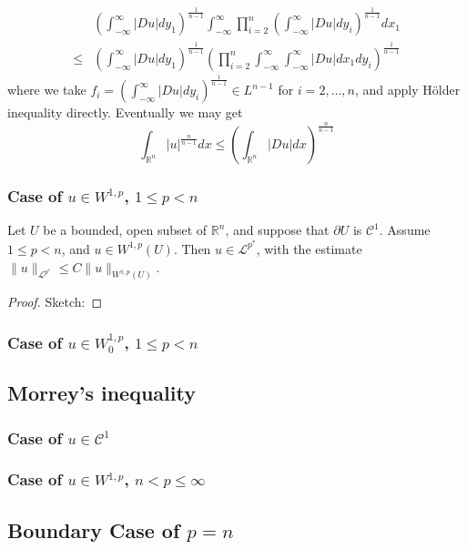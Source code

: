 \documentclass{article}
\begin{document}
\begin{align*}
    &\left(\int_{-\infty}^{\infty}|Du|dy_1\right)^{\frac{1}{n-1}}\int_{-\infty}^{\infty}\prod_{i=2}^{n}\left(\int_{-\infty}^{\infty}|Du|dy_i\right)^{\frac{1}{n-1}}dx_1 \\
    \leq& \left(\int_{-\infty}^{\infty}|Du|dy_1\right)^{\frac{1}{n-1}}\left(\prod_{i=2}^{n}\int_{-\infty}^{\infty}\int_{-\infty}^{\infty}|Du|dx_1dy_i\right)^{\frac{1}{n-1}}
\end{align*}
where we take $f_i=\left(\int_{-\infty}^{\infty}|Du|dy_i\right)^{\frac{1}{n-1}}\in L^{n-1}$ for $i=2, \dots, n$, and apply Hölder inequality directly. Eventually we may get
$$
\int_{\mathbb{R}^n}|u|^{\frac{n}{n-1}}dx\leq\left(\int_{\mathbb{R}^n}|Du|dx\right)^{\frac{n}{n-1}}
$$

\subsubsection{Case of $u\in W^{1,p}$, $1\leq p< n$}

\begin{Th}
    Let $U$ be a bounded, open subset of $\mathbb{R}^n$, and suppose that $\partial U$ is $\mathscr{C}^1$. Assume $1\leq p<n$, and $u\in W^{1, p}(U)$. Then $u\in \mathscr{L}^{p^*}$, with the estimate $\|u\|_{\mathscr{L}^{p^*}}\leq C\|u\|_{W^{1, p}(U)}$.
\end{Th}

\begin{proof}
    Sketch: 
\end{proof}

\subsubsection{Case of $u\in W^{1,p}_{0}$, $1\leq p< n$}


\subsection{Morrey's inequality}

\subsubsection{Case of $u\in \mathscr{C}^{1}$}

\subsubsection{Case of $u\in W^{1, p}$, $n< p\leq \infty$}

\subsection{Boundary Case of $p=n$}
\end{document}
